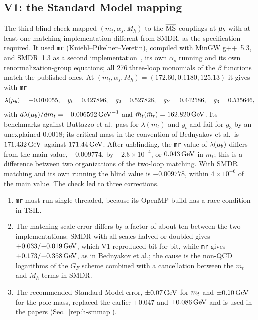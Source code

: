 \subsection{V1: the Standard Model mapping}\label{sec:v19-v1}

The third blind check mapped $(m_t,\alpha_s,M_h)$ to the $\overline{\mathrm{MS}}$ couplings at $\mu_b$ with at least one matching implementation different from SMDR, as the specification required.
It used \texttt{mr} (Kniehl--Pikelner--Veretin), compiled with MinGW g++~5.3, and SMDR~1.3 as a second implementation~\cite{Martin:2019lqd}, its own $\alpha_s$ running and its own renormalization-group equations; all 276 three-loop monomials of the $\beta$ functions match the published ones. %
At $(m_t,\alpha_s,M_h)=(172.60,0.1180,125.13)$ it gives with \texttt{mr}
\begin{equation}
\lambda(\mu_b)=-0.010055,\quad y_t=0.427896,\quad g_2=0.527828,\quad g_Y=0.442586,\quad g_3=0.535646,
\label{eq:v19-v1}
\end{equation}
with $d\lambda(\mu_b)/dm_t=-0.006592\,\mathrm{GeV}^{-1}$ and $\bar m_t(\bar m_t)=162.820\,\mathrm{GeV}$. %
Its benchmarks against Buttazzo et al.\ pass for $\lambda(m_t)$ and $y_t$ and fail for $g_3$ by an unexplained $0.0018$; its critical mass in the convention of Bednyakov et al.\ is $171.432\,\mathrm{GeV}$ against $171.44\,\mathrm{GeV}$. %
After unblinding, the \texttt{mr} value of $\lambda(\mu_b)$ differs from the main value, $-0.009774$, by $-2.8\times10^{-4}$, or $0.043\,\mathrm{GeV}$ in $m_t$; this is a difference between two organizations of the two-loop matching. %
With SMDR matching and its own running the blind value is $-0.009778$, within $4\times10^{-6}$ of the main value. %
The check led to three corrections.
\begin{enumerate}
\item \texttt{mr} must run single-threaded, because its OpenMP build has a race condition in TSIL.
\item The matching-scale error differs by a factor of about ten between the two implementations: SMDR with all scales halved or doubled gives $+0.033/\allowbreak{-}0.019\,\mathrm{GeV}$, which V1 reproduced bit for bit, while \texttt{mr} gives $+0.173/\allowbreak{-}0.358\,\mathrm{GeV}$, as in Bednyakov et al.; the cause is the non-QCD logarithms of the $G_F$ scheme combined with a cancellation between the $m_t$ and $M_h$ terms in SMDR. %
\item The recommended Standard Model error, $\pm0.07\,\mathrm{GeV}$ for $\bar m_t$ and $\pm0.10\,\mathrm{GeV}$ for the pole mass, replaced the earlier $\pm0.047$ and $\pm0.086\,\mathrm{GeV}$ and is used in the papers (Sec.~\ref{rep:h-smmap}). %
\end{enumerate}

